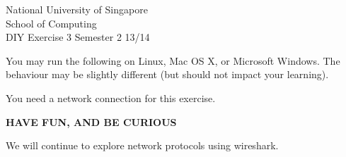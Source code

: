 \documentclass[a4paper,11pt]{exam}
\begin{document}
\extraheadheight{.5in}
%
{\large\sf National University of Singapore\\ School of Computing \\
\LARGE\sf DIY Exercise 3}%
{\large\sf Semester 2 13/14}
\firstpageheadrule
\pagestyle{headandfoot}

You may run the following on Linux, Mac OS X, or Microsoft Windows.  The behaviour may be slightly different (but should not impact your learning).

You need a network connection for this exercise.  

\begin{center}
	\textbf\textsf{HAVE FUN, AND BE CURIOUS}
\end{center}

We will continue to explore network protocols using wireshark. 
\end{document}
